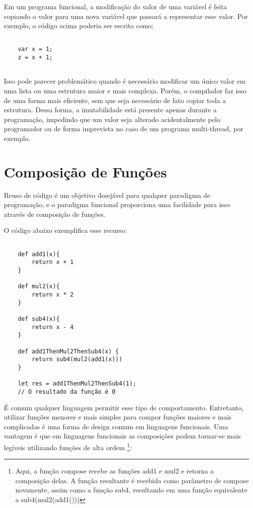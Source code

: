 Em um programa funcional, a modificação do valor 
de uma variável é feita copiando o valor para uma 
nova variável que passará a representar esse valor\cite{functionalscala}.
Por exemplo, o código acima poderia ser escrito 
como:

\begin{lstlisting}[caption={Exemplo de Código Imutável},label=imutablevar]

    var x = 1;
    z = x + 1;


\end{lstlisting}

Isso pode parecer problemático quando é necessário 
modificar um único valor em uma lista ou uma estrutura 
maior e mais complexa. Porém, o compilador faz isso 
de uma forma mais eficiente, sem que seja 
necessário de fato copiar toda a estrutura\cite{functionalscala}. 
Dessa forma, a imutabilidade está presente apenas durante a 
programação, impedindo que um valor seja alterado 
acidentalmente pelo programador ou de forma imprevista 
no caso de um programa multi-thread, por exemplo.


\section{Composição de Funções}

Reuso de código é um objetivo desejável para qualquer 
paradigma de programação, e o paradigma funcional 
proporciona uma facilidade para isso através de 
composição de funções\cite{realworldhaskell}.

O código abaixo exemplifica esse recurso:

\begin{lstlisting}[caption={Exemplo de Composição de Funções},label=fogex]

    def add1(x){
        return x + 1
    }

    def mul2(x){
        return x * 2
    }

    def sub4(x){
        return x - 4
    }

    def add1ThenMul2ThenSub4(x) {
        return sub4(mul2(add1(x)))
    }

    let res = add1ThenMul2ThenSub4(1);
    // O resultado da função é 0

\end{lstlisting}

É comum qualquer linguagem permitir esse tipo 
de comportamento. Entretanto, 
utilizar funções menores e mais simples para compor 
funções maiores e mais complicadas é uma forma de 
design comum em linguagens funcionais. Uma vantagem é 
que em linguagens funcionais as composições podem 
tornar-se mais legíveis utilizando funções 
de alta ordem \footnote{Aqui, a função compose 
recebe as funções add1 e mul2 e retorna a 
composição delas. A função resultante 
é recebida como parâmetro de compose novamente, 
assim como a função sub4, resultando em uma função 
equivalente a sub4(mul2(add1()))}:

